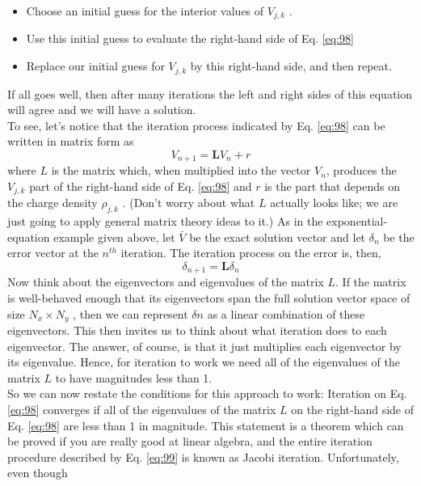 \begin{itemize}
\item Choose an initial guess for the interior values of $V_{j,k}$ .
\item Use this initial guess to evaluate the right-hand side of Eq. \eqref{eq:98}
\item Replace our initial guess for $V_{j,k}$ by this right-hand side, and then repeat.

\end{itemize}
If all goes well, then after many iterations the left and right sides of this equation will agree and we will have a solution. \\
To see, let\rq s notice that the iteration process indicated by Eq. \eqref{eq:98} can be
written in matrix form as
\begin{equation}\label{eq:99}
V_{n+1}=\mathbf{L} V_{n}+r
\end{equation}
where $L$ is the matrix which, when multiplied into the vector $V_n$, produces the
$V_{j,k}$ part of the right-hand side of Eq. \eqref{eq:98} and $r$ is the part that depends on the
charge density $ \rho_{j,k}$ . (Don\rq t worry about what $L$ actually looks like; we are just
going to apply general matrix theory ideas to it.) As in the exponential-equation
example given above, let $\bar{V}$ be the exact solution vector and let $\delta_n$ be the error
vector at the $n^{th}$ iteration. The iteration process on the error is, then,
\begin{equation}\label{eq:910}
\delta_{n+1}=\mathbf{L} \delta_{n}
\end{equation}
Now think about the eigenvectors and eigenvalues of the matrix $L$. If the matrix is
well-behaved enough that its eigenvectors span the full solution vector space of
size $N_x × N_y$ , then we can represent $\delta n$ as a linear combination of these eigenvectors. This then invites us to think about what iteration does to each eigenvector. The answer, of course, is that it just multiplies each eigenvector by its eigenvalue.
Hence, for iteration to work we need all of the eigenvalues of the matrix $L$ to have
magnitudes less than 1.\\
So we can now restate the conditions for this approach to work: Iteration on
Eq. \eqref{eq:98} converges if all of the eigenvalues of the matrix $L$ on the right-hand side
of Eq. \eqref{eq:98} are less than 1 in magnitude. This statement is a theorem which can be
proved if you are really good at linear algebra, and the entire iteration procedure
described by Eq. \eqref{eq:99} is known as Jacobi iteration. Unfortunately, even though

